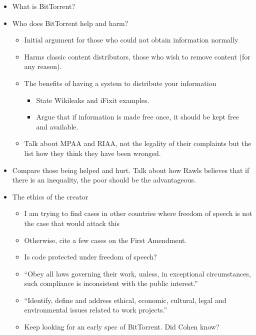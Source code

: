 \documentclass[11pt]{article}
\begin{document}
\begin{itemize}
\item What is BitTorrent?
\item Who does BitTorrent help and harm?
\begin{itemize}
   \item Initial argument for those who could not obtain information normally
   \item Harms classic content distributors, those who wish to remove content (for any reason).
   \item The benefits of having a system to distribute your information
   \begin{itemize}
      \item State Wikileaks and iFixit examples.
      \item Argue that if information is made free once, it should be kept free and available.
   \end{itemize}
   \item Talk about MPAA and RIAA, not the legality of their complaints but the list how they think they have been wronged.
\end{itemize}

\item Compare those being helped and hurt. Talk about how Rawls believes that if there is an inequality, the poor should be the advantageous.

\item The ethics of the creator
\begin{itemize}
   \item I am trying to find cases in other countries where freedom of speech is not the case that would attack this
   \item Otherwise, cite a few cases on the First Amendment. 
   \item Is code protected under freedom of speech?
   \item ``Obey all laws governing their work, unless, in exceptional circumstances, such compliance is inconsistent with the public interest.'' \cite[6.06]{secode}
   \item ``Identify, define and address ethical, economic, cultural, legal and environmental issues related to work projects.'' \cite[3.03]{secode}
   \item Keep looking for an early spec of BitTorrent. Did Cohen know?
\end{itemize}
\end{itemize}


\end{document}

